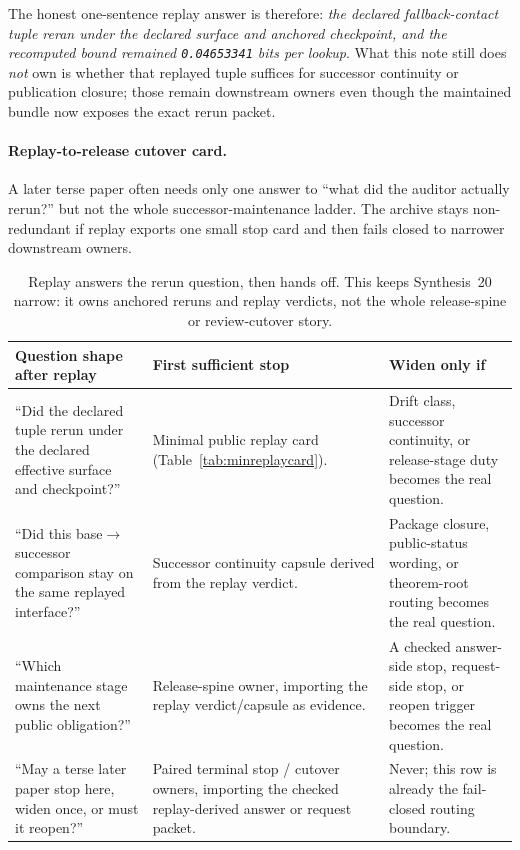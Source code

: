 \documentclass[11pt]{article}
\begin{document}
The honest one-sentence replay answer is therefore: \emph{the declared fallback-contact tuple reran under the declared surface and anchored checkpoint, and the recomputed bound remained \texttt{0.04653341} bits per lookup}. What this note still does \emph{not} own is whether that replayed tuple suffices for successor continuity or publication closure; those remain downstream owners even though the maintained bundle now exposes the exact rerun packet.\cite{series:workedexample,series:planstateequiv,series:deployedsurfaces,series:releasespine}

\paragraph{Replay-to-release cutover card.}
A later terse paper often needs only one answer to ``what did the auditor actually rerun?'' but not the whole successor-maintenance ladder. The archive stays non-redundant if replay exports one small stop card and then fails closed to narrower downstream owners.

\begin{table}[t]
\centering\scriptsize
\begin{tabularx}{\linewidth}{@{}lX X@{}}
\toprule
Question shape after replay & First sufficient stop & Widen only if \\
\midrule
``Did the declared tuple rerun under the declared effective surface and checkpoint?'' & Minimal public replay card (Table~\ref{tab:minreplaycard}). & Drift class, successor continuity, or release-stage duty becomes the real question. \\
``Did this base$\to$successor comparison stay on the same replayed interface?'' & Successor continuity capsule derived from the replay verdict. & Package closure, public-status wording, or theorem-root routing becomes the real question. \\
``Which maintenance stage owns the next public obligation?'' & Release-spine owner, importing the replay verdict/capsule as evidence. & A checked answer-side stop, request-side stop, or reopen trigger becomes the real question. \\
``May a terse later paper stop here, widen once, or must it reopen?'' & Paired terminal stop / cutover owners, importing the checked replay-derived answer or request packet. & Never; this row is already the fail-closed routing boundary. \\
\bottomrule
\end{tabularx}
\caption{Replay answers the rerun question, then hands off. This keeps Synthesis~20 narrow: it owns anchored reruns and replay verdicts, not the whole release-spine or review-cutover story.}
\label{tab:replay-cutover-card}
\end{table}
\end{document}
